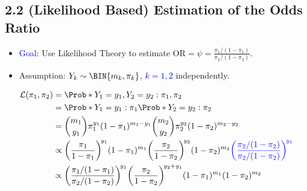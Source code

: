 \documentclass[oneside]{book}\usepackage[]{graphicx}\usepackage[svgnames]{xcolor}
\providecommand\given{} %
\renewcommand\given{\nonscript\:\delimsize\vert\nonscript\:\mathopen{}}%
\renewcommand\given{\nonscript\:\delimsize\vert\nonscript\:\mathopen{}}%
\renewcommand\given{\nonscript\:\delimsize\vert\nonscript\:\mathopen{}}%
\renewcommand\given{\nonscript\:\delimsize\vert\nonscript\:\mathopen{}}%
\renewcommand\given{\nonscript\:\delimsize\vert\nonscript\:\mathopen{}}%
\renewcommand\given{\nonscript\:\delimsize\vert\nonscript\:\mathopen{}}%
\renewcommand\given{\nonscript\:\delimsize\vert\nonscript\:\mathopen{}}%
\renewcommand\given{\nonscript\:\delimsize\vert\nonscript\:\mathopen{}}%
\renewcommand\given{\nonscript\:\delimsize\vert\nonscript\:\mathopen{}}%
\renewcommand\given{\nonscript\:\delimsize\vert\nonscript\:\mathopen{}}%
\renewcommand\given{\nonscript\:\delimsize\vert\nonscript\:\mathopen{}}%
\renewcommand\given{\nonscript\:\delimsize\vert\nonscript\:\mathopen{}}%
\renewcommand\given{:}
\begin{document}
\subsection*{2.2 (Likelihood Based) Estimation of the Odds Ratio}
\begin{itemize}
    \item \textcolor{Blue}{Goal}: Use Likelihood Theory to estimate $ \text{OR}=\psi=\frac{\pi_1/(1-\pi_1)}{\pi_2/(1-\pi_2)} $.
    \item Assumption: \textcolor{Blue}{$ Y_k \sim \BIN{m_k,\pi_k} $, $ k=1,2 $} independently.
\end{itemize}
\begin{align*}
    \mathcal{L}(\pi_1,\pi_2)
     & =\Prob*{Y_1=y_1,Y_2=y_2\given \pi_1,\pi_2}                                                                                                                                                                  \\
     & =\Prob*{Y_1=y_1\given \pi_1}\Prob*{Y_2=y_2\given \pi_2}                                                                                                                                                     \\
     & =\binom{m_1}{y_1}\pi_1^{y_1}(1-\pi_1)^{m_1-y_1}\binom{m_2}{y_2}\pi_2^{y_2}(1-\pi_2)^{m_2-y_2}                                                                                                               \\
     & \propto \biggl(\frac{\pi_1}{1-\pi_1}\biggr)^{\!y_1}(1-\pi_1)^{m_1}\biggl(\frac{\pi_2}{1-\pi_2}\biggr)^{\!y_2}(1-\pi_2)^{m_2}\textcolor{Blue}{\biggl(\frac{\pi_2/(1-\pi_2)}{\pi_2/(1-\pi_2)}\biggr)^{\!y_1}} \\
     & \propto \biggl(\frac{\pi_1/(1-\pi_1)}{\pi_2/(1-\pi_2)}\biggr)^{\!y_1}\biggl(\frac{\pi_2}{1-\pi_2} \biggr)^{\!y_2+y_1}(1-\pi_1)^{m_1}(1-\pi_2)^{m_2}
\end{align*}
\end{document}
